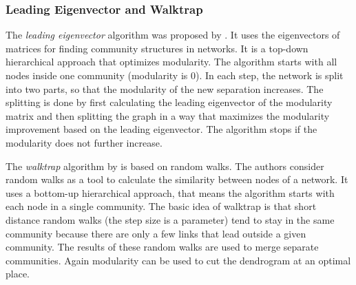 \subsubsection{Leading Eigenvector and Walktrap}
The \emph{leading eigenvector} algorithm was proposed by \textcite{newman2006finding}.
It uses the eigenvectors of matrices for finding community structures in networks.
It is a top-down hierarchical approach that optimizes modularity.
The algorithm starts with all nodes inside one community (modularity is 0).
In each step, the network is split into two parts, so that the modularity of the new separation increases.
The splitting is done by first calculating the leading eigenvector of the modularity matrix and then splitting the graph in a way that maximizes the modularity improvement based on the leading eigenvector.
The algorithm stops if the modularity does not further increase.

The \emph{walktrap} algorithm by\textcite{pons2005computing} is based on random walks.
The authors consider random walks as a tool to calculate the similarity between nodes of a network.
It uses a bottom-up hierarchical approach, that means the algorithm starts with each node in a single community.
The basic idea of walktrap is that short distance random walks (the step size is a parameter) tend to stay in the same community because there are only a few links that lead outside a given community.
The results of these random walks are used to merge separate communities.
Again modularity can be used to cut the dendrogram at an optimal place.